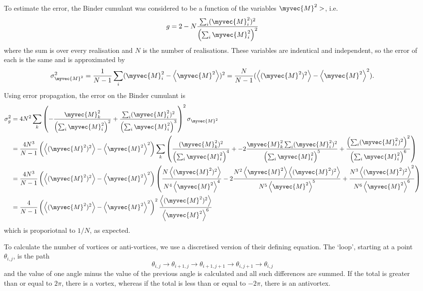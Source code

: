 To estimate the error, the Binder cumulant was considered to be a function of the variables $ \myvec{M}^2 >$, i.e.
\[
g = 2 - N \frac{\sum_i (\myvec{M}^2_i)^2}{\left ( \sum_i \myvec{M}^2_i\right)^2}
\]
where the sum is over every realisation and $N$ is the number of realisations. These variables are indentical and independent, so the error of each is the same and is approximated by 
\[
\sigma^2_{\myvec{M}^2} = \frac{1}{N-1} \sum_i (\myvec{M}^2_i - \left < \myvec{M}^2 \right>)^2 = \frac{N}{N-1} (\left< (\myvec{M}^2)^2 \right > - \left < \myvec{M}^2\right>^2).
\] 
Using error propagation, the error on the Binder cumulant is 
\[
\begin{split}
\sigma_g^2 &= 4N^2 \sum_k \left( -\frac{\myvec{M}^2_k}{\left ( \sum_i \myvec{M}^2_i  \right )^2} + \frac{\sum_i (\myvec{M}^2_i)^2}{\left(\sum_i \myvec{M}^2_i \right)^3} \right)^2 \sigma_{\myvec{M}^2} \\
	   &= \frac{4N^3}{N-1}\left(\left <(\myvec{M}^2)^2 \right >   - \left<\myvec{M}^2\right>^2 \right) \sum_k \left(\frac{(\myvec{M}_k^2)^2}{\left(\sum_i \myvec{M}_i^2 \right)^4} + -2\dfrac{\myvec{M}_k^2 \sum_i (\myvec{M}_i^2)^2}{\left(\sum_i \myvec{M}_i^2\right)^5} + \dfrac{\left(\sum_i(\myvec{M}_i^2)^2\right)^2}{\left(\sum_i \myvec{M}_i^2 \right)^6}\right) \\
	&= \frac{4N^3}{N-1} \left(\left <(\myvec{M}^2)^2 \right >   - \left<\myvec{M}^2\right>^2 \right) \left(\frac{N \left<(\myvec{M}^2)^2 \right>}{N^4 \left<\myvec{M}^2 \right>^4} - 2\frac{N^2 \left< \myvec{M}^2 \right> \left< (\myvec{M}^2)^2 \right>}{N^5 \left<\myvec{M}^2 \right>^5} + \frac{N^3\left<(\myvec{M}^2)^2\right>^2}{N^6\left<\myvec{M}^2\right>^6} \right) \\
	&= 
	\frac{4}{N-1} \left(\left <(\myvec{M}^2)^2 \right >   - \left<\myvec{M}^2\right>^2 \right)^2 \frac{\left<(\myvec{M}^2)^2 \right>}{\left < \myvec{M}^2\right>^6}
\end{split}
\]
which is proporiotnal to $1/N$, as expected. 

To calculate the number of vortices or anti-vortices, we use a discretised version of their defining equation. The `loop', starting at a point $\theta_{i,j}$, is the path
\[
\theta_{i,j} \to \theta_{i+1,j} \to \theta_{i+1,j+1} \to \theta_{i,j+1} \to \theta_{i,j}
\]
and the value of one angle minus the value of the previous angle is calculated and all such differences are summed. If the total is greater than or equal to $2 \pi$, there is a vortex, whereas if the total is less than or equal to $-2 \pi$, there is an antivortex. 



 



